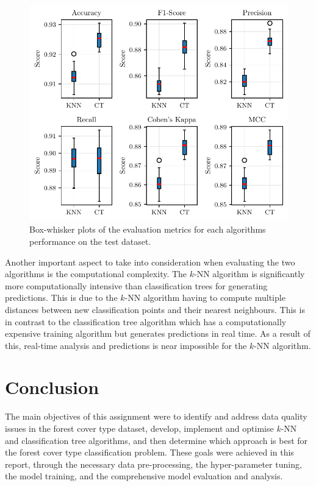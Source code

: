 \documentclass[conference]{IEEEtran}
\begin{document}
	\begin{figure}[hbtp]
		\centering
		\includegraphics[width=\linewidth]{boxplots.pdf}
		\caption{Box-whisker plots of the evaluation metrics for each algorithms performance on the test dataset.}
		\label{fig:boxplots}
	\end{figure}
	
	Another important aspect to take into consideration when evaluating the two algorithms is the computational complexity. The $k$-NN algorithm is significantly more computationally intensive than classification trees for generating predictions. This is due to the $k$-NN algorithm having to compute multiple distances between new classification points and their nearest neighbours. This is in contrast to the classification tree algorithm which has a computationally expensive training algorithm but generates predictions in real time. As a result of this, real-time analysis and predictions is near impossible for the $k$-NN algorithm. 
	
	\section{Conclusion}\label{C}
	The main objectives of this assignment were to identify and address data quality issues in the forest cover type dataset, develop, implement and optimise $k$-NN and classification tree algorithms, and then determine which approach is best for the forest cover type classification problem. These goals were achieved in this report, through the necessary data pre-processing, the hyper-parameter tuning, the model training, and the comprehensive model evaluation and analysis. 
	
\end{document}
